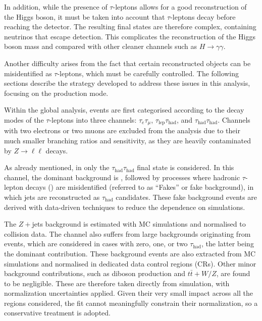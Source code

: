 In addition, while the presence of $\tau$-leptons allows for a good reconstruction of the Higgs boson, it must be taken into account that $\tau$-leptons decay before reaching the detector. The resulting final states are therefore complex, containing neutrinos that escape detection. This complicates the reconstruction of the Higgs boson mass and \pt compared with other cleaner channels such as $H \to \gamma\gamma$.  

Another difficulty arises from the fact that certain reconstructed objects can be misidentified as $\tau$-leptons, which must be carefully controlled. The following sections describe the strategy developed to address these issues in this analysis, focusing on the \ttH production mode. 

Within the global \htautau analysis, events are first categorised according to the decay modes of the $\tau$-leptons into three channels: $\tau_{e}\tau_{\mu}$, $\tau_{\text{lep}}\tau_{\text{had}}$, and $\tau_{\text{had}}\tau_{\text{had}}$. Channels with two electrons or two muons are excluded from the analysis due to their much smaller branching ratios and sensitivity, as they are heavily contaminated by $Z \to \ell\ell$ decays.  

As already mentioned, in \ttHtt only the $\tau_{\text{had}}\tau_{\text{had}}$ final state is considered. In this channel, the dominant background is \ztautau, followed by processes where hadronic $\tau$-lepton decays (\tauhad) are misidentified (referred to as ``Fakes'' or fake background), in which jets are reconstructed as $\tau_{\text{had}}$ candidates.  These fake background events are derived with data-driven techniques to reduce the dependence on simulations.

The $Z+$jets background is estimated with MC simulations and normalised to collision data. The \ttH channel also suffers from large backgrounds originating from \ttbar events, which are considered in cases with zero, one, or two $\tau_{\text{had}}$, the latter being the dominant contribution. These \ttbar background events are also extracted from MC simulations and normalised in dedicated data control regions (CRs). 
Other minor background contributions, such as diboson production and $t\bar{t}+W/Z$, are found to be negligible.  
These are therefore taken directly from simulation, with normalization uncertainties applied.  
Given their very small impact across all the regions considered, the fit cannot meaningfully constrain their normalization, so a conservative treatment is adopted. 

